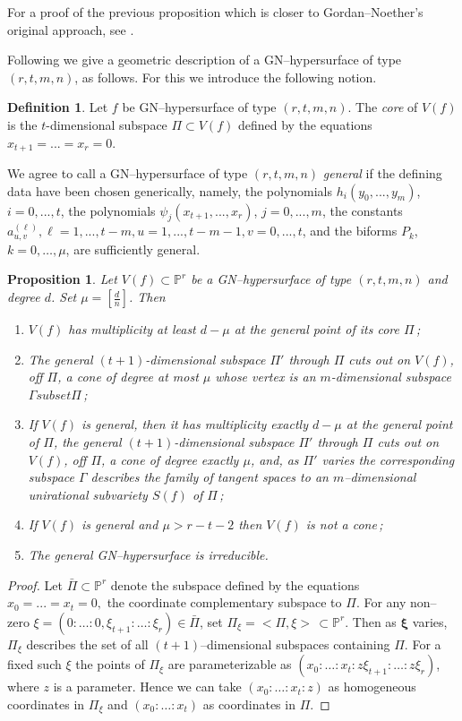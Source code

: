 \documentclass[11pt]{article}   %
\newtheorem{Proposition}[Theorem]{Proposition}
\theoremstyle{definition}
\newtheorem{Definition}[Theorem]{Definition}
\numberwithin{Theorem}{section} \numberwithin{equation}{section}
\newcommand{\p}{{\mathbb P}}
\begin{document}
{For a proof of the previous proposition which is closer to
Gordan--Noether's original approach, see \cite {Lossen}.

Following \cite {Permutti3} we give a geometric description of a
GN--hypersurface of type $(r,t,m,n)$, as follows. For this we
introduce the following notion.

\begin{Definition}\label{core} \rm Let $f$ be {\rm GN}--hypersurface of type $(r,t,m,n)$.
The {\it core\/} of $V(f)$ is the $t$-dimensional subspace
$\Pi\subset V(f)$ defined by the equations $x_{t+1}=...=x_r=0$.
\end{Definition}

We agree to call a GN--hypersurface of type $(r,t,m,n)$ {\it
general\/} if the defining data have been chosen generically, namely,
the polynomials $h_i(y_0,...,y_m)$, $i=0,...,t$, the polynomials
$\psi_j(x_{t+1},...,x_r)$, $j=0,...,m$, the constants $a^
{(\ell)}_{u,v}, {\ell}=1,...,t-m, u=1,...,t-m-1, v=0,...,t$, and
the biforms $P_k$, $k=0,\dots,\mu$,
are sufficiently general.

\begin{Proposition}\label{gn_hypersurface} Let  $V(f)\subset\p^r$ be a
{\rm GN}--hypersurface of type $(r,t,m,n)$ and degree $d$. Set
$\mu=[\frac dn]$. Then
\begin{enumerate}
\item[{\rm (i)}] $V(f)$ has multiplicity at least $d-\mu$ at the general point
of its core $\Pi\,${\rm ;}
\item[{\rm (ii)}] The general $(t+1)$-dimensional subspace $\Pi'$ through $\Pi$ cuts out on
$V(f)$, off $\Pi$, a cone of degree at most  $\mu$ whose vertex is an
$m$-dimensional subspace $\Gamma subset \Pi\,${\rm ;}
\item[{\rm (iii)}]  If $V(f)$ is general, then it has multiplicity exactly $d-\mu$ at the general point
of $\Pi$,  the general $(t+1)$-dimensional subspace $\Pi'$ through $\Pi$  cuts out on
$V(f)$, off $\Pi$, a cone of degree exactly  $\mu$, and,
as $\Pi'$ varies the corresponding subspace
$\Gamma$ describes the family of tangent spaces to an
$m$--dimensional unirational subvariety $S(f)$ of $\Pi\,${\rm ;}
\item [{\rm (iv)}] If $V(f)$ is general and $\mu>r-t-2$ then $V(f)$ is not a cone{\rm $\,$;}
\item [{\rm (v)}] The general {\rm GN}--hypersurface is
irreducible.
\end{enumerate}
\end{Proposition}
\begin{proof}
Let $\bar{\Pi}\subset \p^r$ denote the subspace defined by the
equations $x_0=...=x_t=0,$ the coordinate complementary subspace to
$\Pi$. For any non--zero $\xi=(0:\ldots: 0,\xi_{t+1}:\ldots:
\xi_r)\in \bar{\Pi}$, set $\Pi_{\xi}=<\Pi,\xi>\,\subset \p^r$. Then
as $\mathbf{\xi}$ varies, $\Pi_\xi$ describes the set of all
$(t+1)$--dimensional subspaces containing $\Pi$. For a fixed such
$\xi$ the points of $\Pi_\xi$ are parameterizable as $(x_0:\ldots
:x_t : z\xi_{t+1}:\ldots : z\xi_r)$, where $z$ is a parameter. Hence
we can take $(x_0:\ldots :x_t : z)$ as homogeneous coordinates in
$\Pi_\xi$ and $(x_0:\ldots :x_t)$ as coordinates in $\Pi$.


\end{proof}}
\end{document}
